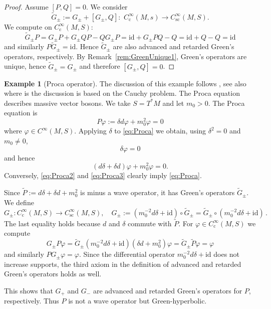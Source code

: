 \documentclass[a4paper,11pt]{amsart}
\theoremstyle{definition}
\newtheorem{ex}[thm]{Example}
\begin{document}
\begin{proof}
Assume $[P,Q]=0$.
We consider
$$
\tilde G_\pm := G_\pm + [G_\pm,Q] :\,\, {C^\infty_\mathrm{c}}(M,s) \to {C^\infty_\mathrm{sc}}(M,S).
$$
We compute on ${C^\infty_\mathrm{c}}(M,S)$:
$$
\tilde G_\pm P 
= G_\pm P + G_\pm QP -QG_\pm P 
= {\mathrm{id}} + G_\pm PQ - Q
= {\mathrm{id}} + Q - Q 
= {\mathrm{id}} 
$$
and similarly $P\tilde G_\pm = {\mathrm{id}}$.
Hence $\tilde G_\pm$ are also advanced and retarded Green's operators, respectively.
By Remark~\ref{rem:GreenUnique1}, Green's operators are unique, hence $\tilde G_\pm=G_\pm$ and therefore $[G_\pm,Q]=0$.
\end{proof}

\begin{ex}[Proca operator]
The discussion of this example follows \cite[p.~116f]{St}, see also \cite{Furlani} where is the discussion is based on the Cauchy problem.
The Proca equation describes massive vector bosons.
We take $S=T^*M$ and let $m_0>0$.
The Proca equation is
\begin{equation}
P{\varphi} := \delta d {\varphi} + m_0^2 {\varphi} =0
\label{eq:Proca}
\end{equation}
where ${\varphi}\in{C^\infty}(M,S)$.
Applying $\delta$ to \eqref{eq:Proca} we obtain, using $\delta^2=0$ and $m_0\neq 0$,
\begin{equation}
\delta{\varphi}=0
\label{eq:Proca2}
\end{equation}
and hence
\begin{equation}
(d\delta+\delta d){\varphi} + m_0^2{\varphi} = 0.
\label{eq:Proca3}
\end{equation}
Conversely, \eqref{eq:Proca2} and \eqref{eq:Proca3} clearly imply \eqref{eq:Proca}.

Since $\tilde P := d\delta+\delta d + m_0^2$ is minus a wave operator, it has Green's operators $\tilde G_\pm$.
We define
$$
G_\pm :{C^\infty_\mathrm{c}}(M,S) \to {C^\infty_\mathrm{sc}}(M,S), \quad 
G_\pm 
:= (m_0^{-2}d\delta + {\mathrm{id}})\circ \tilde G_\pm 
= \tilde G_\pm \circ (m_0^{-2}d\delta + {\mathrm{id}}) \, .
$$
The last equality holds because $d$ and $\delta$ commute with $\tilde P$.
For ${\varphi}\in{C^\infty_\mathrm{c}}(M,S)$ we compute
$$
G_\pm P{\varphi} 
=
\tilde G_\pm (m_0^{-2}d\delta + {\mathrm{id}})(\delta d + m_0^2){\varphi}=
\tilde G_\pm \tilde P{\varphi} = {\varphi}
$$
and similarly $PG_\pm{\varphi}={\varphi}$.
Since the differential operator $m_0^{-2}d\delta + {\mathrm{id}}$ does not increase supports, the third axiom in the definition of advanced and retarded Green's operators holds as well.

This shows that $G_+$ and $G_-$ are advanced and retarded Green's operators for $P$, respectively.
Thus $P$ is not a wave operator but Green-hyperbolic.
\end{ex}
\end{document}
